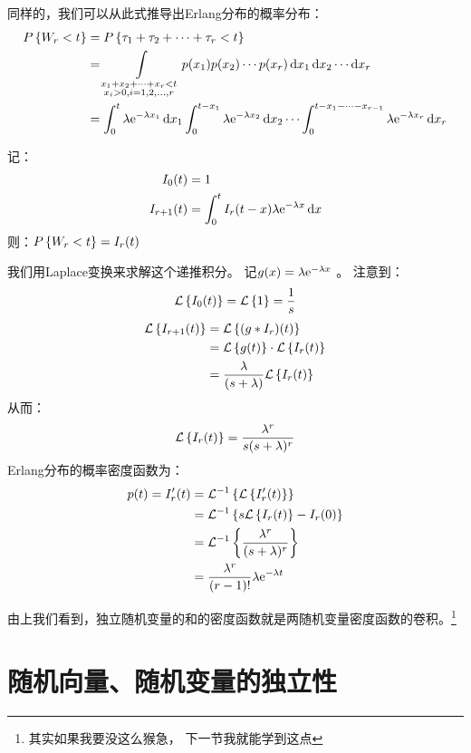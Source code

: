 同样的，我们可以从此式推导出Erlang分布的概率分布：
\begin{align*}
    \P{W_{r}<t} &= \P{\tau_{1}+\tau_{2}+\cdots+\tau_{r}<t} \\
    &= \int\limits_{\substack{x_{1}+x_{2}+\dots +x_{r}<t
    \\ x_{i}>0, i=1,2,\ldots,r}} p(x_{1}) p(x_{2}) \cdots p(x_{r})
    \d{x}_{1} \d{x}_{2} \cdots \d{x}_{r} \\
    &=\int_{0}^{t} \lambda \e^{-\lambda x_{1}} \d{x_{1}}
    \int_{0}^{t-x_{1}} \lambda \e^{-\lambda x_{2}} \d{x_{2}} \cdots
    \int_{0}^{t-x_{1}-\cdots-x_{r-1}} \lambda \e^{-\lambda
    x_{r}} \d{x_{r}} \\
\end{align*}

记：
\begin{align*}
    I_{0}(t) &= 1\\
    I_{r+1}(t) &= \int_{0}^{t} I_{r}(t-x) \lambda \e^{-\lambda x} \d{x}
    \end{align*}
则：\(\P{W_{r}<t} = I_{r}(t)\)

我们用Laplace变换来求解这个递推积分。
记\(g(x) = \lambda \e^{-\lambda x} \) 。
注意到：
\[
    \L{I_{0}(t)} = \L{1} = \frac{1}{s} \\
\]
\begin{align*}
    \L{I_{r+1}(t)} &= \L{(g * I_{r})(t)} \\
    &= \L{g(t)} \cdot \L{I_{r}(t)} \\
    &= \frac{\lambda}{(s+\lambda)} \L{I_{r}(t)}\\
\end{align*}
从而：\[
    \L{I_{r}(t)} = \frac{\lambda^{r}}{s(s+\lambda)^{r}} \\
\]
Erlang分布的概率密度函数为：
\begin{align*}
    p(t) = I_{r}'(t) &= \invL{\L{I_{r}'(t)}} \\
    &= \invL{s\L{I_{r}(t)} - I_{r}(0)} \\
    &= \invL{\frac{\lambda^{r}}{(s+\lambda)^{r}}} \\
    &= \frac{\lambda^{r}}{(r-1)!} \lambda \e^{-\lambda t} \\
\end{align*}

由上我们看到，独立随机变量的和的密度函数就是两随机变量密度函数的卷积。\footnote{其实如果我要没这么猴急，
下一节我就能学到这点}

\section{随机向量、随机变量的独立性}
